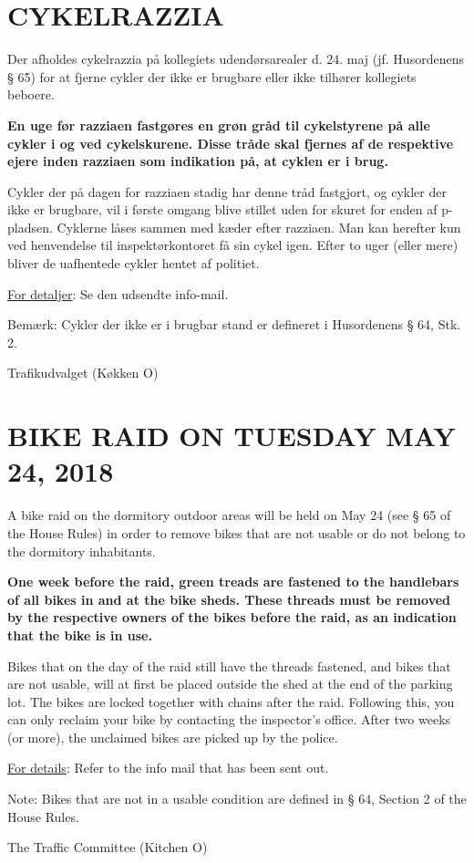\documentclass[12pt,a4paper]{article}
\begin{document}
\section*{CYKELRAZZIA }
Der afholdes cykelrazzia på kollegiets udendørsarealer d. 24. maj (jf. Husordenens § 65) for at fjerne cykler der ikke er brugbare eller ikke tilhører kollegiets beboere. 

\textbf{En uge før razziaen fastgøres en grøn gråd til cykelstyrene på alle cykler i og ved cykelskurene. Disse tråde skal fjernes af de respektive ejere inden razziaen som indikation på, at cyklen er i brug.}

Cykler der på dagen for razziaen stadig har denne tråd fastgjort, og cykler der ikke er brugbare, vil i første omgang blive stillet uden for skuret for enden af p-pladsen. Cyklerne låses sammen med kæder efter razziaen. Man kan herefter kun ved henvendelse til inspektørkontoret få sin cykel igen. Efter to uger (eller mere) bliver de uafhentede cykler hentet af politiet. 

\underline{For detaljer}: Se den udsendte info-mail.

Bemærk: Cykler der ikke er i brugbar stand er defineret i Husordenens § 64, Stk. 2. 
 
\hspace*{2cm} Trafikudvalget (Køkken O)
 
\section*{BIKE RAID ON TUESDAY MAY 24, 2018}
A bike raid on the dormitory outdoor areas will be held on May 24 (see § 65 of the House Rules) in order to remove bikes that are not usable or do not belong to the dormitory inhabitants. 

\textbf{One week before the raid, green treads are fastened to the handlebars of all bikes in and at the bike sheds. These threads must be removed by the respective owners of the bikes before the raid, as an indication that the bike is in use.}

Bikes that on the day of the raid still have the threads fastened, and bikes that are not usable, will at first be placed outside the shed at the end of the parking lot. The bikes are locked together with chains after the raid. Following this, you can only reclaim your bike by contacting the inspector’s office. After two weeks (or more), the unclaimed bikes are picked up by the police. 

\underline{For details}: Refer to the info mail that has been sent out.

Note: Bikes that are not in a usable condition are defined in § 64, Section 2 of the House Rules.

\hspace*{2cm} The Traffic Committee (Kitchen O)
\end{document}
